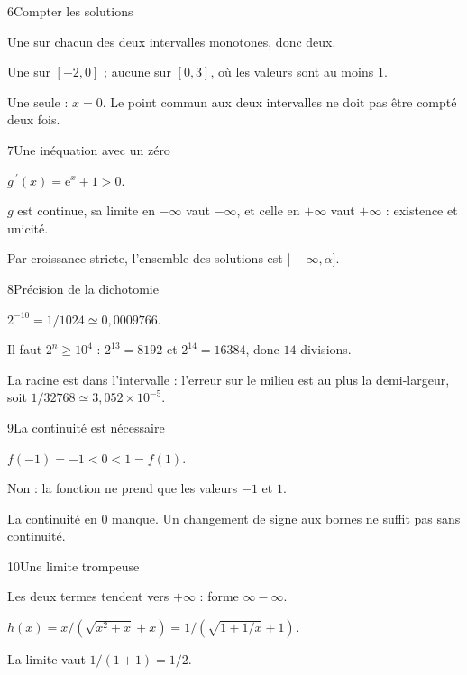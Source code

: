 \begin{corrige}{6}{Compter les solutions}
\begin{questions}
\item Une sur chacun des deux intervalles monotones, donc deux.
\item Une sur $[-2,0]$ ; aucune sur $[0,3]$, où les valeurs sont au moins $1$.
\item Une seule : $x=0$. Le point commun aux deux intervalles ne doit pas être compté deux fois.
\end{questions}
\end{corrige}
\begin{corrige}{7}{Une inéquation avec un zéro}
\begin{questions}
\item $g\,\!^{\prime}(x)=\mathrm e^x+1>0$.
\item $g$ est continue, sa limite en $-\infty$ vaut $-\infty$, et celle en $+\infty$ vaut $+\infty$ : existence et unicité.
\item Par croissance stricte, l’ensemble des solutions est $]-\infty,\alpha]$.
\end{questions}
\end{corrige}
\begin{corrige}{8}{Précision de la dichotomie}
\begin{questions}
\item $2^{-10}=1/1024\simeq0{,}0009766$.
\item Il faut $2^n\geq10^4$ : $2^{13}=8192$ et $2^{14}=16384$, donc $14$ divisions.
\item La racine est dans l’intervalle : l’erreur sur le milieu est au plus la demi-largeur, soit $1/32768\simeq3{,}052\times10^{-5}$.
\end{questions}
\end{corrige}
\begin{corrige}{9}{La continuité est nécessaire}
\begin{questions}
\item $f(-1)=-1<0<1=f(1)$.
\item Non : la fonction ne prend que les valeurs $-1$ et $1$.
\item La continuité en $0$ manque. Un changement de signe aux bornes ne suffit pas sans continuité.
\end{questions}
\end{corrige}
\begin{corrige}{10}{Une limite trompeuse}
\begin{questions}
\item Les deux termes tendent vers $+\infty$ : forme $\infty-\infty$.
\item $h(x)=x/(\sqrt{x^2+x}+x)=1/(\sqrt{1+1/x}+1)$.
\item La limite vaut $1/(1+1)=1/2$.
\end{questions}
\end{corrige}
